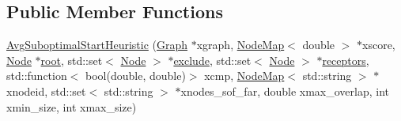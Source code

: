 \subsection*{Public Member Functions}
\begin{DoxyCompactItemize}
\item 
\hyperlink{classderegnet_1_1AvgSuboptimalStartHeuristic_a12082995005a50591bb64951417b2a96}{Avg\+Suboptimal\+Start\+Heuristic} (\hyperlink{namespacederegnet_a55b76c55bbabc682cbc61f8b9948799e}{Graph} $\ast$xgraph, \hyperlink{namespacederegnet_ae102b707ae1d6f83c639ece5e0dd5658}{Node\+Map}$<$ double $>$ $\ast$xscore, \hyperlink{namespacederegnet_a744bad34f2de9856d36715a445f027f3}{Node} $\ast$\hyperlink{classderegnet_1_1DeregnetStartHeuristic_a4605d41352e3adf1f9f9f32466a4e61e}{root}, std\+::set$<$ \hyperlink{namespacederegnet_a744bad34f2de9856d36715a445f027f3}{Node} $>$ $\ast$\hyperlink{classderegnet_1_1DeregnetStartHeuristic_aa22c6581cd404bf7ac325850b28dc951}{exclude}, std\+::set$<$ \hyperlink{namespacederegnet_a744bad34f2de9856d36715a445f027f3}{Node} $>$ $\ast$\hyperlink{classderegnet_1_1DeregnetStartHeuristic_ab80c046ff2b7c64086fceb84987b3e50}{receptors}, std\+::function$<$ bool(double, double)$>$ xcmp, \hyperlink{namespacederegnet_ae102b707ae1d6f83c639ece5e0dd5658}{Node\+Map}$<$ std\+::string $>$ $\ast$xnodeid, std\+::set$<$ std\+::string $>$ $\ast$xnodes\+\_\+sof\+\_\+far, double xmax\+\_\+overlap, int xmin\+\_\+size, int xmax\+\_\+size)
\end{DoxyCompactItemize}
